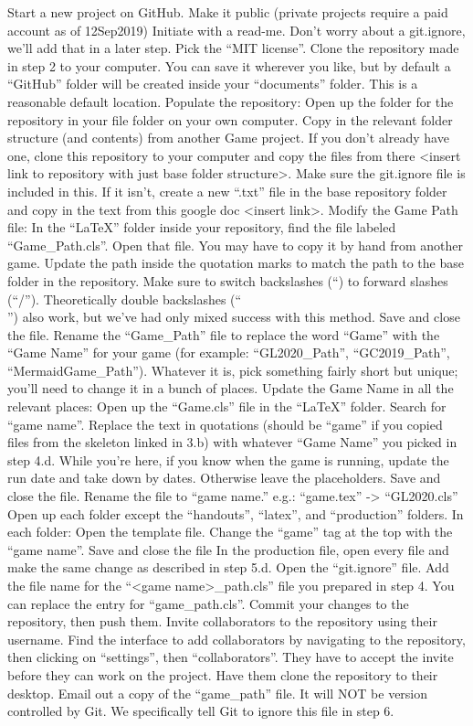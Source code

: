 Start a new project on GitHub.
Make it public (private projects require a paid account as of 12Sep2019)
Initiate with a read-me. 
Don’t worry about a git.ignore, we’ll add that in a later step.
Pick the “MIT license”.
Clone the repository made in step 2 to your computer. You can save it wherever you like, but by default a “GitHub” folder will be created inside your “documents” folder. This is a reasonable default location.
Populate the repository:
Open up the folder for the repository in your file folder on your own computer.
Copy in the relevant folder structure (and contents) from another Game project. If you don’t already have one, clone this repository to your computer and copy the files from there <insert link to repository with just base folder structure>.
Make sure the git.ignore file is included in this. If it isn’t, create a new “.txt” file in the base repository folder and copy in the text from this google doc <insert link>.
Modify the Game Path file:
In the “LaTeX” folder inside your repository, find the file labeled “Game_Path.cls”. Open that file. You may have to copy it by hand from another game.
Update the path inside the quotation marks to match the path to the base folder in the repository. Make sure to switch backslashes (“\”) to forward slashes (“/”). Theoretically double backslashes (“\\”) also work, but we’ve had only mixed success with this method.
Save and close the file.
Rename the “Game_Path” file to replace the word “Game” with the “Game Name” for your game (for example: “GL2020_Path”, “GC2019_Path”, “MermaidGame_Path”). Whatever it is, pick something fairly short but unique; you’ll need to change it in a bunch of places.
Update the Game Name in all the relevant places:
Open up the “Game.cls” file in the “LaTeX” folder. Search for “game name”. Replace the text in quotations (should be “game” if you copied files from the skeleton linked in 3.b) with whatever “Game Name” you picked in step 4.d.
While you're here, if you know when the game is running, update the run date and take down by dates. Otherwise leave the placeholders.
Save and close the file.
Rename the file to “game name.” e.g.: “game.tex” -> “GL2020.cls”
Open up each folder except the “handouts”, “latex”, and “production” folders. In each folder:
Open the template file. Change the “game” tag at the top with the “game name”.
Save and close the file
In the production file, open every file and make the same change as described in step 5.d.
Open the “git.ignore” file. Add the file name for the “<game name>_path.cls” file you prepared in step 4. You can replace the entry for “game_path.cls”.
Commit your changes to the repository, then push them.
Invite collaborators to the repository using their username. Find the interface to add collaborators by navigating to the repository, then clicking on “settings”, then “collaborators”. They have to accept the invite before they can work on the project. Have them clone the repository to their desktop.
Email out a copy of the “game_path” file. It will NOT be version controlled by Git. We specifically tell Git to ignore this file in step 6.


